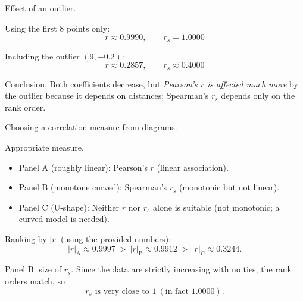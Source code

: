 \documentclass[11pt]{article}
\def\textbf#1{#1}%
\def\textit#1{#1}%
\begin{document}
\begin{solution}
\textbf{Effect of an outlier.}

\textit{Using the first 8 points only:}
\[
\boxed{\,r \approx 0.9990,\qquad r_s = 1.0000\,}
\]

\textit{Including the outlier }$(9,-0.2)$:
\[
\boxed{\,r \approx 0.2857,\qquad r_s \approx 0.4000\,}
\]

\textit{Conclusion.} Both coefficients decrease, but \emph{Pearson’s $r$ is affected much more} by the outlier because it depends on distances; Spearman’s $r_s$ depends only on the rank order.

\begin{center}
\end{center}
\end{solution}

\begin{solution}
\textbf{Choosing a correlation measure from diagrams.}

\textit{Appropriate measure.}
\begin{itemize}
  \item \textbf{Panel A (roughly linear):} Pearson’s $r$ (linear association).
  \item \textbf{Panel B (monotone curved):} Spearman’s $r_s$ (monotonic but not linear).
  \item \textbf{Panel C (U-shape):} Neither $r$ nor $r_s$ alone is suitable (not monotonic; a curved model is needed).
\end{itemize}

\textit{Ranking by }$|r|$ (using the provided numbers):
\[
|r|_{\text{A}}\approx 0.9997\ >\ |r|_{\text{B}}\approx 0.9912\ >\ |r|_{\text{C}}\approx 0.3244.
\]

\textit{Panel B: size of $r_s$.} Since the data are strictly increasing with no ties, the rank orders match, so
\[
\boxed{\,r_s \text{ is very close to }1\ (\text{in fact }1.0000).\,}
\]
\end{solution}
\end{document}
